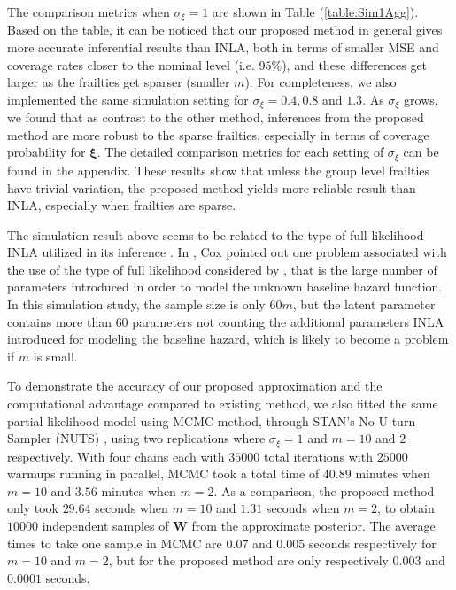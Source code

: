 \documentclass[ba]{imsart}
\begin{document}
The comparison metrics when $\sigma_\xi = 1$ are shown in Table (\ref{table:Sim1Agg}). Based on the table, it can be noticed that our proposed method in general gives more accurate inferential results than INLA, both in terms of smaller MSE and coverage rates closer to the nominal level (i.e. $95\%$), and these differences get larger as the frailties get sparser (smaller $m$). 
For completeness, we also implemented the same simulation setting for $\sigma_\xi = 0.4, 0.8$ and $1.3$. As $\sigma_\xi$ grows, we found that as contrast to the other method, inferences from the proposed method are more robust to the sparse frailties, especially in terms of coverage probability for $\boldsymbol{\xi}$. The detailed comparison metrics for each setting of $\sigma_\xi$ can be found in the appendix. These results show that unless the group level frailties have trivial variation, the proposed method yields more reliable result than INLA, especially when frailties are sparse.

The simulation result above seems to be related to the type of full likelihood INLA utilized in its inference \citep{inlacoxph}. In \cite{coxdiscussion}, Cox pointed out one problem associated with the use of the type of full likelihood considered by \cite{inlacoxph}, that is the large number of parameters introduced in order to model the unknown baseline hazard function. In this simulation study, the sample size is only $60m$, but the latent parameter contains more than $60$ parameters not counting the additional parameters INLA introduced for modeling the baseline hazard, which is likely to become a problem if $m$ is small. 

To demonstrate the accuracy of our proposed approximation and the computational advantage compared to existing method, we also fitted the same partial likelihood model using MCMC method, through STAN's No U-turn Sampler (NUTS) \citep{NUTS}, using two replications where $\sigma_\xi = 1$ and $m = 10$ and $2$ respectively. With four chains each with $35000$ total iterations with $25000$ warmups running in parallel, MCMC took a total time of $40.89$ minutes when $m = 10$ and $3.56$ minutes when $m = 2$. As a comparison, the proposed method only took $29.64$ seconds when $m = 10$ and $1.31$ seconds when $m = 2$, to obtain $10000$ independent samples of $\boldsymbol{W}$ from the approximate posterior. The average times to take one sample in MCMC are $0.07$ and $0.005$ seconds respectively for $m = 10$ and $m = 2$, but for the proposed method are only respectively $0.003$ and $0.0001$ seconds.
\end{document}

